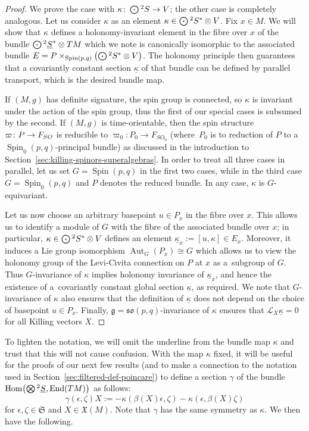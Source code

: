 \documentclass[11pt]{article}
\numberwithin{equation}{section}
\numberwithin{equation}{section}
\newcommand{\fg}{\mathfrak{g}}
\newcommand{\fso}{\mathfrak{so}}
\newcommand{\fX}{\mathfrak{X}}
\newcommand{\fS}{\mathfrak{S}}
\newcommand{\eL}{\mathscr{L}}
\newcommand{\Sbundle}{\underline{S}}
\newcommand{\Odot}{\mathchoice{{\textstyle\bigodot}}{\bigodot}{\bigodot}{\bigodot}}
\newcommand{\Otimes}{\mathchoice{{\textstyle\bigotimes}}{\bigotimes}{\bigotimes}{\bigotimes}}
\newcommand{\1}{\mathbbm{1}}
\DeclareMathOperator{\End}{End}
\DeclareMathOperator{\Hom}{Hom}
\DeclareMathOperator{\Spin}{Spin}
\DeclareMathOperator{\Aut}{Aut}
\begin{document}
\begin{proof}
	We prove the case with $\kappa\colon \Odot^2S\to V$; the other case is completely analogous. Let us consider $\kappa$ as an element $\kappa\in\Odot^2S^*\otimes V$. Fix $x\in M$. We will show that $\kappa$ defines a holonomy-invariant element in the fibre over $x$ of the bundle $\Odot^2\Sbundle^*\otimes TM$ which we note is canonically isomorphic to the associated bundle $E=P\times_{\Spin(p,q)}\bigl(\Odot^2S^*\otimes V\bigr)$. The holonomy principle then guarantees that a covariantly constant section $\underline\kappa$ of that bundle can be defined by parallel transport, which is the desired bundle map.
	
	If $(M,g)$ has definite signature, the spin group is connected, so $\kappa$ is invariant under the action of the spin group, thus the first of our special cases is subsumed by the second. If $(M,g)$ is time-orientable, then the spin structure $\varpi\colon P\to F_{\rm SO}$ is reducible to $\varpi_0\colon P_0\to F_{SO_0}$ (where~$P_0$ is to reduction of $P$ to a $\Spin_0(p,q)$-principal bundle) as discussed in the introduction to Section~\ref{sec:killing-spinors-superalgebras}. In order to treat all three cases in parallel, let us set $G=\Spin(p,q)$ in the first two cases, while in the third case $G=\Spin_0(p,q)$ and $P$ denotes the reduced bundle. In any case, $\kappa$ is $G$-equivariant.
	
	Let us now choose an arbitrary basepoint $u\in P_x$ in the fibre over $x$. This allows us to identify a module of $G$ with the fibre of the associated bundle over $x$; in particular, $\kappa\in\Odot^2S^*\otimes V$ defines an element $\underline\kappa_x:=[u,\kappa]\in E_x$. Moreover, it induces a Lie group isomorphism $\Aut_G(P_x)\cong G$ which allows us to view the holonomy group of the Levi-Civita connection on $P$ at $x$ as a~subgroup of $G$. Thus $G$-invariance of $\kappa$ implies holonomy invariance of $\underline\kappa_x$, and hence the existence of a~covariantly constant global section $\underline\kappa$, as required. We note that $G$-invariance of $\kappa$ also ensures that the definition of $\underline\kappa$ does not depend on the choice of basepoint $u\in P_x$. Finally, $\fg=\fso(p,q)$-invariance of $\kappa$ ensures that $\eL_X\underline\kappa=0$ for all Killing vectors $X$.
\end{proof}

To lighten the notation, we will omit the underline from the bundle map $\kappa$ and trust that this will not cause confusion. With the map $\kappa$ fixed, it will be useful for the proofs of our next few results (and to make a connection to the notation used in Section~\ref{sec:filtered-def-poincare}) to define a section $\gamma$ of the bundle $\Hom\bigl(\Otimes^2\Sbundle,\End(TM)\bigr)$ as follows:
\begin{equation}\label{eq:gamma-geom-def}
	\gamma(\epsilon,\zeta)X := - \kappa(\beta(X)\epsilon,\zeta) - \kappa(\epsilon,\beta(X)\zeta)
\end{equation}
for $\epsilon,\zeta\in\fS$ and $X\in\fX(M)$. Note that $\gamma$ has the same symmetry as $\kappa$. We then have the following.
\end{document}
